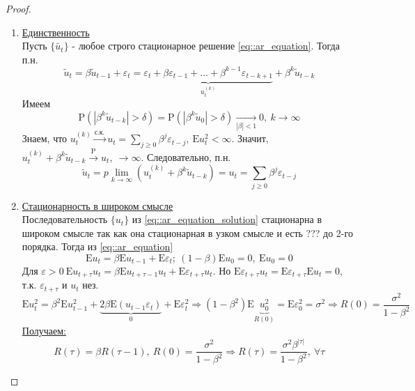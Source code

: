 \documentclass[12pt]{article}
\def\eps{ \varepsilon }
\def\E{ \mathrm{E} }
\def\P{ \mathrm{P} }
\begin{document}
\begin{proof}
\begin{enumerate}
        \item \underline{Единственность} \\
        Пусть $\{\widetilde{u_t}\}$ - любое строго стационарное решение \eqref{eq::ar_equation}.
        Тогда п.н.
        \[\widetilde{u}_t=\beta\widetilde{u}_{t-1}+\eps_t=\underbrace{\eps_t+\beta\eps_{t-1}+\ldots+\beta^{k-1}\eps_{t-k+1}}_{u_t^{(k)}}+\beta^k\widetilde{u}_{t-k}\]
        Имеем
        \[\P(|\beta^k\widetilde{u}_{t-k}|>\delta)=\P(|\beta^k\widetilde{u}_0|>\delta)\underset{|\beta|<1}{\rightarrow}0,\ k\rightarrow\infty\]
        Знаем, что $u_t^{(k)}\xrightarrow{\text{с.к.}}u_t=\sum_{j\geq0}\beta^j\eps_{t-j},\ \E u_t^2<\infty$.
        Значит, $u_t^{(k)}+\beta^k\widetilde{u}_{t-k}\xrightarrow{\P}u_t,\ \rightarrow\infty$.
        Следовательно, п.н.
        \[\widetilde{u}_t=p\lim_{k\rightarrow\infty}(u_t^{(k)}+\beta^k\widetilde{u}_{t-k})=u_t=\sum_{j\geq0}\beta^j\eps_{t-j}\]
        \item \underline{Стационарность в широком смысле} \\
        Последовательность $\{u_t\}$ из \eqref{eq::ar_equation_solution} стационарна в широком смысле
        так как она стационарная в узком смысле и есть ??? до 2-го порядка.
        Тогда из \eqref{eq::ar_equation} 
        \[\E u_t=\beta\E u_{t-1}+\E\eps_t;\ (1-\beta)\E u_0=0,\ \E u_0=0\]
        Для $\eps>0\ \E u_{t+\tau}u_t=\beta\E u_{t+\tau-1}u_t+\E\eps_{t+\tau}u_t$. Но $\E\eps_{t+\tau}u_t=\E\eps_{t+\tau}\E u_t=0$, т.к. $\eps_{t+\tau}$ и $u_t$ нез.
        \[\E u_t^2=\beta^2\E u_{t-1}^2+\underbrace{2\beta\E(u_{t-1}\eps_t)}_0+\E\eps_t^2\Rightarrow
        (1-\beta^2)\E\underbrace{u_0^2}_{R(0)}=\E\eps_0^2=\sigma^2\Rightarrow R(0)=\frac{\sigma^2}{1-\beta^2}\]
        \underline{Получаем:} 
        \[R(\tau)=\beta R(\tau-1),\ R(0)=\frac{\sigma^2}{1-\beta^2}\Rightarrow R(\tau)=\frac{\sigma^2\beta^{|\tau|}}{1-\beta^2},\ \forall\tau\]
    \end{enumerate}
\end{proof}
\end{document}
